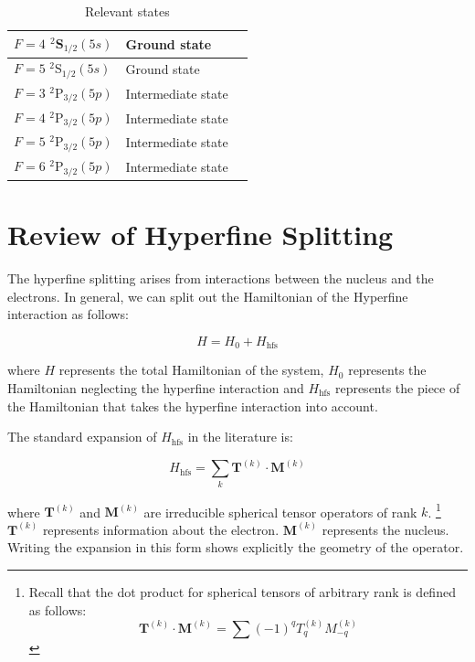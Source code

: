 \begin{table}[h]
\centering
\begin{tabular}{|l|l|||r|}
\hline
$F=4$ $^2$S$_{1/2} (5s)$ & Ground state  \\ \hline
$F=5$ $^2$S$_{1/2} (5s)$ & Ground state  \\ \hline
$F=3$ $^2$P$_{3/2} (5p)$ & Intermediate state  \\ \hline
$F=4$ $^2$P$_{3/2} (5p)$ & Intermediate state  \\ \hline
$F=5$ $^2$P$_{3/2} (5p)$ & Intermediate state  \\ \hline
$F=6$ $^2$P$_{3/2} (5p)$ & Intermediate state  \\ \hline
\end{tabular}
\caption{Relevant states}
\label{tableOfStates}
\end{table}

\section{Review of Hyperfine Splitting}

The hyperfine splitting arises from interactions between the nucleus and the electrons. In general, we can split out the Hamiltonian of the Hyperfine interaction as follows: 

\begin{equation}
H=H_0+H_{\mathrm{hfs}}
\end{equation}

where $H$ represents the total Hamiltonian of the system, $H_0$ represents the Hamiltonian neglecting the hyperfine interaction and $H_{\mathrm{hfs}}$ represents the piece of the Hamiltonian that takes the hyperfine interaction into account. 

The standard expansion of $H_{\mathrm{hfs}}$ in the literature is:  

\begin{equation}
H_{\mathrm{hfs}}=\sum_k \mathbf{T}^{(k)} \cdot \mathbf{M}^{(k)} \label{hfs_hamiltonian_eqn}
\end{equation}
\cite{schwartz_hyperfine_expansion}
\cite{experimental_hyperfine_alkali_arimondo}
\cite{chinesePhysics}

where $\mathbf{T}^{(k)}$ and $\mathbf{M}^{(k)}$ are irreducible spherical tensor operators of rank $k$.
\footnote{Recall that the dot product for spherical tensors of arbitrary rank is defined as follows:
\begin{equation}\label{TkMk_hyperfine}
\mathbf{T}^{(k)}\cdot\mathbf{M}^{(k)}=\sum (-1)^qT_q^{(k)}M_{-q}^{(k)}
\end{equation}
}
 $\mathbf{T}^{(k)}$ represents information about the electron.
$\mathbf{M}^{(k)}$ represents the nucleus.\cite{experimental_hyperfine_alkali_arimondo}\cite{schwartz_hyperfine_expansion}
\cite{sobelman_spectra}
Writing the expansion in this form shows explicitly the geometry of the operator.

